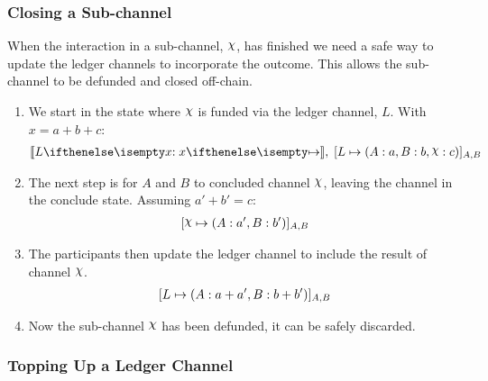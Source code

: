 \subsubsection{Closing a Sub-channel}

\begin{figure}[h]\centering
  \makebox[\textwidth][c]{}
  \caption{
  }\label{fig:closing-sub-channel}
\end{figure}

When the interaction in a sub-channel, $\rchi$, has finished we need a safe way to update the ledger channels to incorporate the outcome.
This allows the sub-channel to be defunded and closed off-chain.
\begin{enumerate}
  \item We start in the state where $\rchi$ is funded via the ledger channel, $L$. With $x = a + b + c$:
  \begin{align}
    \adj{\holds{L}{x}{}}, \; \finalizable{L}{\alloc{A: a, B: b, \rchi: c}}{A, B}
  \end{align}
  \item The next step is for $A$ and $B$ to concluded channel $\rchi$, leaving the channel in the conclude state. Assuming $a' + b' = c$:
  \begin{align}
    \finalizable{\rchi}{\alloc{A:a', B:b'}}{A,B}
  \end{align}
  \item The participants then update the ledger channel to include the result of channel $\rchi$.
  \begin{align}
    [L \mapsto ( A: a+ a', B: b + b' )]_{A, B}
  \end{align}
  \item Now the sub-channel $\rchi$ has been defunded, it can be safely discarded.
\end{enumerate}

\subsubsection{Topping Up a Ledger Channel}

\begin{figure}[h]\centering
  \makebox[\textwidth][c]{}
  \caption{
  }\label{fig:ledger-top-up}
\end{figure}

